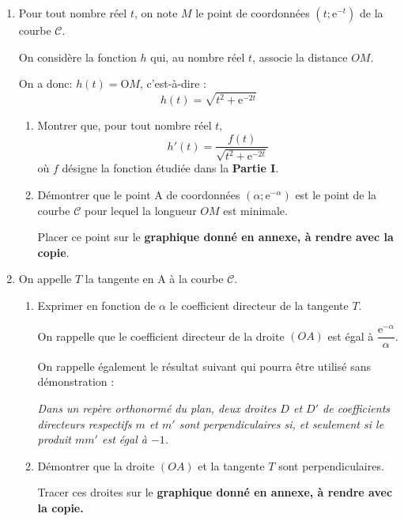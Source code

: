 \begin{enumerate}
	\item Pour tout nombre réel $t$, on note $M$ le point de coordonnées $\left(t;\text{e}^{-t}\right)$ de la courbe $\mathcal{C}$.
	
	On considère la fonction $h$ qui, au nombre réel $t$, associe la distance $OM$.
	
	On a donc: $h(t) = \text{O}M$, c'est-à-dire : \[h(t) = \sqrt{t^2 + \text{e}^{-2t}}\]
	\begin{enumerate}
		\item Montrer que, pour tout nombre réel $t$, \[h'(t) = \dfrac{f(t)}{\sqrt{t^2 + \text{e}^{-2t}}}\] où $f$ désigne la fonction étudiée dans la \textbf{Partie I}.
		\item Démontrer que le point A de coordonnées $\left(\alpha;\text{e}^{-\alpha}\right)$ est le point de la courbe $\mathcal{C}$ pour lequel la longueur $OM$ est minimale.
		
		Placer ce point sur le \textbf{graphique donné en annexe, à rendre avec la copie}.
	\end{enumerate}
	\item On appelle $T$ la tangente en A à la courbe $\mathcal{C}$.
	\begin{enumerate}
		\item Exprimer en fonction de $\alpha$ le coefficient directeur de la tangente $T$.
		
		On rappelle que le coefficient directeur de la droite $(OA)$ est égal à $\dfrac{\text{e}^{-\alpha}}{\alpha}$.
		
		On rappelle également le résultat suivant qui pourra être utilisé sans démonstration :
		
		\emph{Dans un repère orthonormé du plan, deux droites $D$ et $D'$ de coefficients directeurs respectifs $m$ et $m'$ sont perpendiculaires si, et seulement si le produit $mm'$ est égal à $-1$.}
		
		\item Démontrer que la droite $(OA)$ et la tangente $T$ sont perpendiculaires. 
		
		Tracer ces droites sur le \textbf{graphique donné en annexe, à rendre avec la copie.}
	\end{enumerate}
\end{enumerate}

